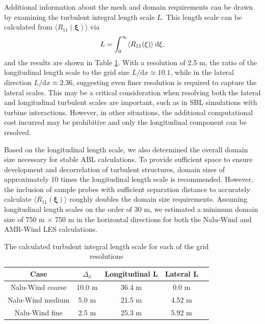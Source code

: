 Additional information about the mesh and domain requirements can be
drawn by examining the turbulent integral length scale $L$.  This
length scale can be calculated from $\langle R_{11}(\boldsymbol{\xi})
\rangle$ via
\begin{equation}
  L = \int_0^\infty \langle R_{11}(\xi) \rangle \: {\textrm d}\xi,
\end{equation}
and the results are shown in Table \ref{tab:GridStudyLscale}.  With a
resolution of 2.5 m, the ratio of the longitudinal length scale to the
grid size $L/\textrm{d}x \approx 10.1$, while in the lateral direction
$L/\textrm{d}x \approx 2.36$, suggesting even finer resolution is
required to capture the lateral scales.  This may be a critical
consideration when resolving both the lateral and longitudinal
turbulent scales are important, such as in SBL simulations with
turbine interactions.  However, in other situations, the additional
computational cost incurred may be prohibitive and only the
longitudinal component can be resolved.

Based on the longitudinal length scale, we also determined the
overall domain size necessary for stable ABL calculations.  To provide
sufficient space to ensure development and decorrelation of turbulent
structures, domain sizes of approximately 10 times the longitudinal
length scale is recommended.  However, the inclusion of sample probes
with sufficient separation distance to accurately calculate $\langle
R_{11}(\boldsymbol{\xi}) \rangle$ roughly doubles the domain size
requirements.  Assuming longitudinal length scales on the order of
30 m, we estimated a minimum domain size of 750 m $\times$ 750 m in the
horizontal directions for both the Nalu-Wind and AMR-Wind LES
calculations.

\begin{table} %
\caption{\label{tab:GridStudyLscale} The calculated turbulent integral
  length scale for each of the grid resolutions} \centering
\begin{tabular}{ccccc}
  \hline
  Case              & $\Delta_x$ & Longitudinal L  & Lateral L \\
  \hline
  Nalu-Wind coarse  &  10.0 m  & 36.4 m         & 0.0 m     \\
  Nalu-Wind medium  &   5.0 m & 21.5 m         & 4.52 m    \\
  Nalu-Wind fine    &   2.5 m & 25.3 m         & 5.92 m    \\
\hline
\end{tabular}
\end{table}

